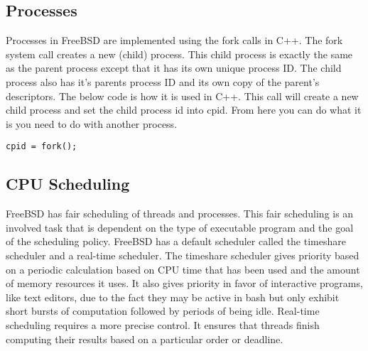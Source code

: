 \documentclass[letterpaper,10pt,titlepage,draftclsnofoot,onecolumn]{IEEEtran}
\begin{document}

\subsection{Processes}

Processes in FreeBSD are implemented using the fork calls in C++. The fork system call creates a new (child) process. This child process is exactly the same as the parent process except that it has its own unique process ID. The child process also has it's parents process ID and its own copy of the parent's descriptors. The below code is how it is used in C++. This call will create a new child process and set the child process id into cpid. From here you can do what it is you need to do with another process.  


\begin{lstlisting}
cpid = fork();
\end{lstlisting}



\subsection{CPU Scheduling}

FreeBSD has fair scheduling of threads and processes. This fair scheduling is an involved task that is dependent on the type of executable program and the goal of the scheduling policy. \cite{FreeBSD} FreeBSD has a default scheduler called the timeshare scheduler and a real-time scheduler. The timeshare scheduler gives priority based on a periodic calculation based on CPU time that has been used and the amount of memory resources it uses. It also gives priority in favor of interactive programs, like text editors, due to the fact they may be active in bash but only exhibit short bursts of computation followed by periods of being idle. Real-time scheduling requires a more precise control. It ensures that threads finish computing their results based on a particular order or deadline. 
\end{document}
